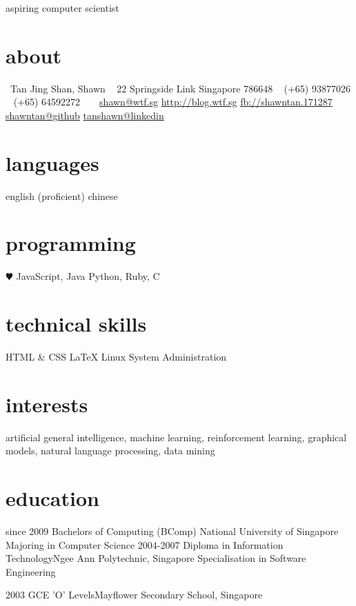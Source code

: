 \documentclass[]{friggeri-cv}
\begin{document}
{aspiring computer scientist}


\begin{aside}
	\section{about}
	\Male~Tan Jing Shan, Shawn
	\Letter~ 22 Springside Link
	Singapore 786648
	\Mobilefone~ (+65) 93877026
	\Telefon~ (+65) 64592272
	~
	\Email~ \href{mailto:shawn@wtf.sg}{shawn@wtf.sg}
	\href{http://blog.wtf.sg}{http://blog.wtf.sg}
	\href{http://facebook.com/shawntan.171287}{fb://shawntan.171287}
	\href{http://github.com/shawntan}{shawntan@github}
	\href{http://sg.linkedin.com/in/tanshawn}{tanshawn@linkedin}
	\section{languages}
	english (proficient)
	chinese
	\section{programming}
	{\color{red} $\varheartsuit$} JavaScript, Java
	Python, Ruby, C
	\section{technical skills}
	HTML \& CSS
	\LaTeX
	Linux System Administration
\end{aside}

\section{interests}

artificial general intelligence, machine learning, reinforcement learning, graphical models, natural language processing, data mining

\section{education}

\begin{entrylist}
	\entry
	{since 2009}
	{Bachelors of Computing (BComp)}
	{National University of Singapore}
	{Majoring in Computer Science}
	\entry
	{2004-2007}
	{Diploma in Information Technology}{Ngee Ann Polytechnic, Singapore}
	{Specialisation in Software Engineering}

	\entry
	{2003}
	{GCE 'O' Levels}{Mayflower Secondary School, Singapore}
	{}
\end{entrylist}
\end{document}
